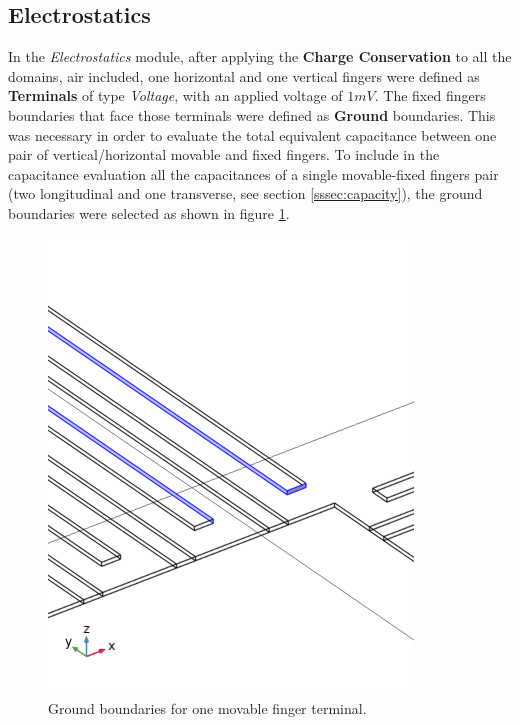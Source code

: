\documentclass[lettersize,journal]{IEEEtran}
\begin{document}
        \subsection{Electrostatics}
        In the \textit{Electrostatics} module, after applying the \textbf{Charge Conservation} to all the domains, air included, one horizontal and one vertical fingers were defined as \textbf{Terminals} of type \textit{Voltage}, with an applied voltage of \(1mV\). The fixed fingers boundaries that face those terminals were defined as \textbf{Ground} boundaries. This was necessary in order to evaluate the total equivalent capacitance between one pair of vertical/horizontal movable and fixed fingers. To include in the capacitance evaluation all the capacitances of a single movable-fixed fingers pair (two longitudinal and one transverse, see section \ref{sssec:capacity}), the ground boundaries were selected as shown in figure \ref{fig:grounds}.
        
        \begin{figure}[!h]
            \centering
            \includegraphics[width=1.0\linewidth]{grounds.png}
            \caption{Ground boundaries for one movable finger terminal.}
            \label{fig:grounds}
        \end{figure}
        
\end{document}
